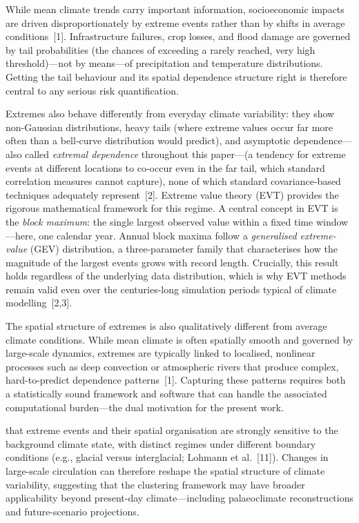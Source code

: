 \documentclass[preprint,12pt,a4paper]{elsarticle}
\newcommand{\revg}[1]{{\color{RevisionGreen}#1}}
\newcommand{\revo}[1]{{\color{RevisionOrange}#1}}
\begin{document}
\revg{While mean climate trends carry important information,
socioeconomic impacts are driven disproportionately by extreme events
rather than by shifts in average conditions~[1]. Infrastructure
failures, crop losses, and flood damage are governed by tail
probabilities (the chances of exceeding a rarely reached, very high
threshold)---not by means---of precipitation and temperature
distributions. Getting the tail behaviour and its spatial dependence
structure right is therefore central to any serious risk
quantification.}

\revg{Extremes also behave differently from everyday climate
variability: they show non-Gaussian distributions, heavy
tails (where extreme values occur far more often than a bell-curve
distribution would predict), and asymptotic dependence---also called
\emph{extremal dependence} throughout this paper---\revo{(a tendency
for extreme events at different locations to co-occur even in the far
tail, which standard correlation measures cannot capture)}, none of which standard
covariance-based techniques adequately represent~[2]. Extreme
value theory (EVT) provides the rigorous mathematical framework
for this regime. A central concept in EVT is the \emph{block
maximum}: the single largest observed value within a fixed time
window---here, one calendar year. Annual block maxima follow a
\emph{generalised extreme-value} (GEV) distribution, a
three-parameter family that characterises how the magnitude of the
largest events grows with record length. Crucially, this result
holds regardless of the underlying data distribution, which is why
EVT methods remain valid even over the centuries-long simulation
periods typical of climate modelling~[2,3].}

\revg{The spatial structure of extremes is also qualitatively
different from \revo{average climate conditions. While mean climate is often spatially smooth}
and governed by large-scale dynamics, extremes are typically
linked to localised, nonlinear processes such as deep convection or
atmospheric rivers that produce complex, hard-to-predict dependence
patterns~[1]. Capturing these patterns requires both a
statistically sound framework and software that can handle the
associated computational burden---the dual motivation for the
present work.}

\revg{\revo{Long-term palaeoclimate records show} that extreme events and their spatial organisation are
\revo{strongly sensitive to the background climate state,} with distinct
regimes under different boundary conditions (e.g., glacial versus
interglacial; Lohmann et al.~[11]). Changes in large-scale
circulation can therefore reshape the spatial structure of climate
variability, suggesting that the clustering framework may have
broader applicability beyond present-day climate---including
palaeoclimate reconstructions and future-scenario projections.}
\end{document}
